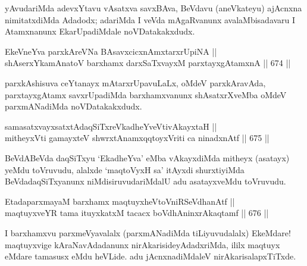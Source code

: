 \begin{artha} 
yAvudariMda adevxYtavu vAsatxva savxBAva, BeVdavu (aneVkateyu) 
ajAcnxna nimitatxdiMda Adadodx; adariMda I veVda mAgaRvanunx 
avalaMbisadavaru I Atamxnanunx EkarUpadiMdale noVDatakakxdudx.
\end{artha}

\begin{shl}
EkeVneYva parxkAreVNa BAsavxcicxnAmxtarxrUpiNA || \\
shAserxYkamAnatoV barxhamx darxSaTxvayxM parxtayxgAtamxnA \hfill || 674 ||  
\end{shl}

\begin{artha} 
parxkAshisuva ceYtanayx mAtarxrUpavuLaLx, oMdeV parxkAravAda, 
parxtayxgAtamx savxrUpadiMda barxhamxvanunx shAsatxrXveMba oMdeV 
parxmANadiMda noVDatakakxdudx.
\end{artha}


\begin{shl}
samasatxvayxsatxtAdaqSiTxreVkadheYveVtivAkayxtaH || \\
mitheyxVti gamayxteV shwrxtAnamxqqtoyxVriti ca ninadxnAtf \hfill || 675 ||  
\end{shl}

\begin{artha} 
BeVdABeVda daqSiTxyu `EkadheYva' eMba vAkayxdiMda mitheyx (asatayx) 
yeMdu toVruvudu, alalxde `maqtoVyxH sa' itAyxdi shurxtiyiMda 
BeVdadaqSiTxyanunx niMdisiruvudariMdalU adu asatayxveMdu toVruvudu.
\end{artha}


\begin{shl}
EtadaparxmayaM barxhamx maqtuyxheVtoVniRSeVdhanAtf || \\
maqtuyxveYR tama ituyxkatxM tacacx boVdhAninxrAkaqtamf \hfill || 676 ||  
\end{shl}

\begin{artha} 
I barxhamxvu parxmeVyavalalx (parxmANadiMda tiLiyuvudalalx) EkeMdare! maqtuyxvige kAraNavAdadanunx nirAkarisideyAdadxriMda, ililx maqtuyx eMdare tamasusx eMdu heVLide. adu jAcnxnadiMdaleV nirAkarisalapxTiTxde.
\end{artha}


